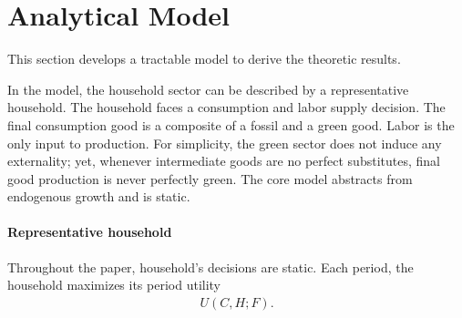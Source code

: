 \section{Analytical Model}\label{sec:mod_an}

This section develops a tractable model  to derive the theoretic results. 

In the model, the household sector can be described by a representative household. The household faces a consumption and labor supply decision. The final consumption good is a composite of a fossil and a green good. Labor is the only input to production. For simplicity, the green sector does not induce any externality; yet, whenever intermediate goods are no perfect substitutes, final good production is never perfectly green. The core model abstracts from endogenous growth and is static. 

\paragraph{Representative household}
Throughout the paper, household's decisions are static. Each period, the household maximizes its period utility
\begin{align}
U(C,H; F).
\end{align} 

